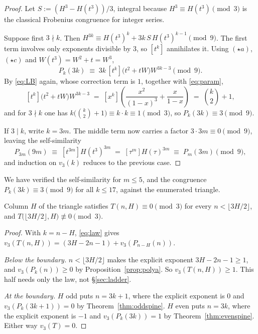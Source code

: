 \documentclass[11pt]{article}
\newcommand{\vthree}{v_3}
\begin{document}
\begin{proof}
Let $S := (H^3 - H(t^3))/3$, integral because $H^3 \equiv H(t^3) \pmod 3$ is the
classical Frobenius congruence for integer series.

Suppose first $3 \nmid k$. Then
$H^{3k} \equiv H(t^3)^k + 3k\,S\,H(t^3)^{k-1} \pmod 9$. The first term involves
only exponents divisible by $3$, so $[t^k]$ annihilates it. Using $(\star a)$,
$(\star c)$ and $W(t^3) = W^2 + t = W^3$,
\[
  P_k(3k) \;\equiv\; 3k\,[t^k]\bigl(t^2 + tW\bigr)W^{3k-3} \pmod 9 .
\]
By \eqref{eq:LB} again, whose correction term is $1$, together with
\eqref{eq:param},
\[
  [t^k]\bigl(t^2+tW\bigr)W^{3k-3}
  \;=\; [x^k]\left(\frac{x^2}{(1-x)^3} + \frac{x}{1-x}\right)
  \;=\; \binom{k}{2} + 1 ,
\]
and for $3 \nmid k$ one has
$k\bigl(\binom{k}{2}+1\bigr) \equiv k\cdot k \equiv 1 \pmod 3$, so
$P_k(3k) \equiv 3 \pmod 9$.

If $3 \mid k$, write $k = 3m$. The middle term now carries a factor
$3 \cdot 3m \equiv 0 \pmod 9$, leaving the self-similarity
\[
  P_{3m}(9m) \;\equiv\; [t^{3m}]H(t^3)^{3m}
  \;=\; [\tau^{m}]H(\tau)^{3m} \;\equiv\; P_m(3m) \pmod 9 ,
\]
and induction on $\vthree(k)$ reduces to the previous case.
\end{proof}

We have verified the self-similarity for $m \le 5$, and the congruence
$P_k(3k)\equiv3\pmod 9$ for all $k \le 17$, against the enumerated triangle.

\begin{theorem}
\label{thm:activation}
Column $H$ of the triangle satisfies $T(n,H) \equiv 0 \pmod 3$ for every
$n < \lfloor 3H/2\rfloor$, and $T\bigl(\lfloor 3H/2\rfloor, H\bigr)
\not\equiv 0 \pmod 3$.
\end{theorem}

\begin{proof}
With $k = n - H$, \eqref{eq:law} gives
$\vthree(T(n,H)) = (3H-2n-1) + \vthree(P_{n-H}(n))$.

\emph{Below the boundary.} $n < \lfloor 3H/2\rfloor$ makes the explicit exponent
$3H-2n-1 \ge 1$, and $\vthree(P_k(n)) \ge 0$ by Proposition~\ref{prop:polya}. So
$\vthree(T(n,H)) \ge 1$. This half needs only the law, not \S\ref{sec:ladder}.

\emph{At the boundary.} $H$ odd puts $n = 3k+1$, where the explicit exponent is
$0$ and $\vthree(P_k(3k+1)) = 0$ by Theorem~\ref{thm:oddspine}. $H$ even puts
$n = 3k$, where the explicit exponent is $-1$ and $\vthree(P_k(3k)) = 1$ by
Theorem~\ref{thm:evenspine}. Either way $\vthree(T) = 0$.
\end{proof}
\end{document}
